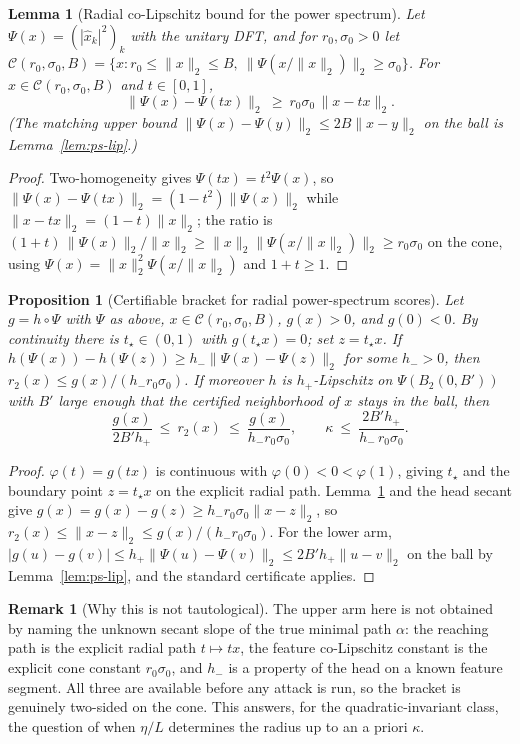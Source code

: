 \documentclass{article}
\newtheorem{lemma}{Lemma}
\newtheorem{proposition}{Proposition}
\theoremstyle{definition}
\newtheorem{remark}{Remark}
\begin{document}
\begin{lemma}[Radial co-Lipschitz bound for the power spectrum]\label{lem:ps-colip}
Let $\Psi(x)=(|\hat x_k|^2)_k$ with the unitary DFT, and for $r_0,\sigma_0>0$ let $\mathcal C(r_0,\sigma_0,B)=\{x:r_0\le\|x\|_2\le B,\ \|\Psi(x/\|x\|_2)\|_2\ge\sigma_0\}$. For $x\in\mathcal C(r_0,\sigma_0,B)$ and $t\in[0,1]$,
\[
\|\Psi(x)-\Psi(tx)\|_2\ \ge\ r_0\sigma_0\,\|x-tx\|_2 .
\]
(The matching upper bound $\|\Psi(x)-\Psi(y)\|_2\le2B\|x-y\|_2$ on the ball is Lemma~\ref{lem:ps-lip}.)
\end{lemma}
\begin{proof}
Two-homogeneity gives $\Psi(tx)=t^2\Psi(x)$, so $\|\Psi(x)-\Psi(tx)\|_2=(1-t^2)\|\Psi(x)\|_2$ while $\|x-tx\|_2=(1-t)\|x\|_2$; the ratio is $(1+t)\,\|\Psi(x)\|_2/\|x\|_2\ge\|x\|_2\|\Psi(x/\|x\|_2)\|_2\ge r_0\sigma_0$ on the cone, using $\Psi(x)=\|x\|_2^2\Psi(x/\|x\|_2)$ and $1+t\ge1$.
\end{proof}

\begin{proposition}[Certifiable bracket for radial power-spectrum scores]\label{prop:ps-alpha}
Let $g=h\circ\Psi$ with $\Psi$ as above, $x\in\mathcal C(r_0,\sigma_0,B)$, $g(x)>0$, and $g(0)<0$. By continuity there is $t_\star\in(0,1)$ with $g(t_\star x)=0$; set $z=t_\star x$. If $h(\Psi(x))-h(\Psi(z))\ge h_-\|\Psi(x)-\Psi(z)\|_2$ for some $h_->0$, then $r_2(x)\le g(x)/(h_-r_0\sigma_0)$. If moreover $h$ is $h_+$-Lipschitz on $\Psi(B_2(0,B'))$ with $B'$ large enough that the certified neighborhood of $x$ stays in the ball, then
\[
\frac{g(x)}{2B'h_+}\ \le\ r_2(x)\ \le\ \frac{g(x)}{h_-r_0\sigma_0},
\qquad
\kappa\ \le\ \frac{2B'h_+}{h_-\,r_0\sigma_0}.
\]
\end{proposition}
\begin{proof}
$\varphi(t)=g(tx)$ is continuous with $\varphi(0)<0<\varphi(1)$, giving $t_\star$ and the boundary point $z=t_\star x$ on the explicit radial path. Lemma~\ref{lem:ps-colip} and the head secant give $g(x)=g(x)-g(z)\ge h_-r_0\sigma_0\|x-z\|_2$, so $r_2(x)\le\|x-z\|_2\le g(x)/(h_-r_0\sigma_0)$. For the lower arm, $|g(u)-g(v)|\le h_+\|\Psi(u)-\Psi(v)\|_2\le2B'h_+\|u-v\|_2$ on the ball by Lemma~\ref{lem:ps-lip}, and the standard certificate applies.
\end{proof}

\begin{remark}[Why this is not tautological]\label{rem:alpha-cert}
The upper arm here is not obtained by naming the unknown secant slope of the true minimal path $\alpha$: the reaching path is the explicit radial path $t\mapsto tx$, the feature co-Lipschitz constant is the explicit cone constant $r_0\sigma_0$, and $h_-$ is a property of the head on a known feature segment. All three are available before any attack is run, so the bracket is genuinely two-sided on the cone. This answers, for the quadratic-invariant class, the question of when $\eta/L$ determines the radius up to an a priori $\kappa$.
\end{remark}
\end{document}
